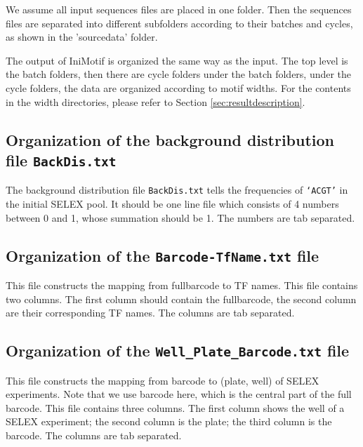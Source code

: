\documentclass[a4paper,10pt]{article}
\begin{document}
We assume all input sequences files are placed in one folder. 
Then the sequences files are separated into different subfolders according to their batches and cycles, as shown in the 'sourcedata' folder.

The output of IniMotif is organized the same way as the input. 
The top level is the batch folders, then there are cycle folders under the batch folders, under the cycle folders, the data are organized according to motif widths.
For the contents in the width directories, please refer to Section \ref{sec:resultdescription}.


\subsection{Organization of the background distribution file \texttt{BackDis.txt}}
The background distribution file \texttt{BackDis.txt} tells the frequencies of \texttt{`ACGT'} in the initial SELEX pool.
It should be one line file which consists of 4 numbers between 0 and 1, whose summation should be 1.
The numbers are tab separated.


\subsection{Organization of the \texttt{Barcode-TfName.txt} file}
This file constructs the mapping from fullbarcode to TF names.
This file contains two columns.
The first column should contain the fullbarcode, the second column are their corresponding TF names.
The columns are tab separated.


\subsection{Organization of the \texttt{Well\_Plate\_Barcode.txt} file}
This file constructs the mapping from barcode to (plate, well) of SELEX experiments.
Note that we use barcode here, which is the central part of the full barcode.
This file contains three columns. 
The first column shows the well of a SELEX experiment; the second column is the plate; the third column is the barcode.
The columns are tab separated.
\end{document}
